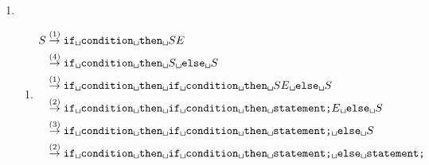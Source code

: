 \begin{enumerate}[1.]
  \item \begin{enumerate}
    \item
      \begin{align*}
        S & \stackrel{(1)}{\rightarrow}
          \texttt{if\textvisiblespace{}condition\textvisiblespace{}then\textvisiblespace{}}SE\\
          & \stackrel{(4)}{\rightarrow}
          \texttt{if\textvisiblespace{}condition\textvisiblespace{}then\textvisiblespace{}}S\texttt{\textvisiblespace{}else\textvisiblespace{}}S\\
          & \stackrel{(1)}{\rightarrow}
          \texttt{if\textvisiblespace{}condition\textvisiblespace{}then\textvisiblespace{}}\texttt{if\textvisiblespace{}condition\textvisiblespace{}then\textvisiblespace{}}SE\texttt{\textvisiblespace{}else\textvisiblespace{}}S\\
          & \stackrel{(2)}{\rightarrow}
          \texttt{if\textvisiblespace{}condition\textvisiblespace{}then\textvisiblespace{}}\texttt{if\textvisiblespace{}condition\textvisiblespace{}then\textvisiblespace{}statement;}E\texttt{\textvisiblespace{}else\textvisiblespace{}}S\\
          & \stackrel{(3)}{\rightarrow}
          \texttt{if\textvisiblespace{}condition\textvisiblespace{}then\textvisiblespace{}}\texttt{if\textvisiblespace{}condition\textvisiblespace{}then\textvisiblespace{}statement;}\texttt{\textvisiblespace{}else\textvisiblespace{}}S\\
          & \stackrel{(2)}{\rightarrow}
          \texttt{if\textvisiblespace{}condition\textvisiblespace{}then\textvisiblespace{}}\texttt{if\textvisiblespace{}condition\textvisiblespace{}then\textvisiblespace{}statement;}\texttt{\textvisiblespace{}else\textvisiblespace{}statement;}
      \end{align*}


\end{enumerate}
\end{enumerate}
